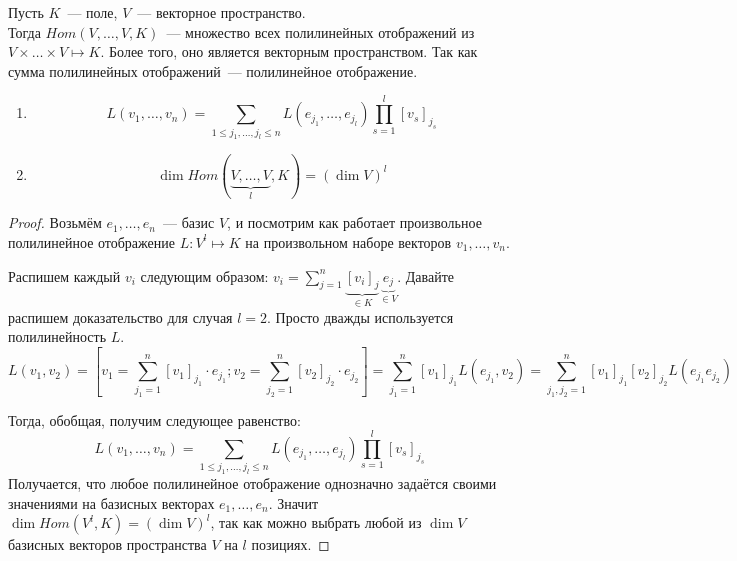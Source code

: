 \begin{definition}
    Пусть $K$~--- поле, $V$~--- векторное пространство.\\ 
    Тогда $Hom(V,\dots, V,K)$~--- множество всех полилинейных отображений
    из $V\times\dots\times V\mapsto K$.
    Более того, оно является векторным пространством. Так как сумма полилинейных
    отображений~--- полилинейное отображение.
\end{definition}
\begin{statement}\leavevmode
    \begin{enumerate}
        \item \[
                L(v_1,\dots, v_n) = \sum\limits_{1\le j_1, \dots, j_l \le n}^{}{L(e_{j_1}, \dots, e_{j_l})\prod\limits_{s=1}^{l}{[v_s]_{j_s}}}
            \]
        \item \[
                \dim Hom(\underbrace{V,\dots, V}_{l}, K) = (\dim V)^l
            \]
    \end{enumerate}
\end{statement}
\begin{proof}
    Возьмём $e_1,\dots, e_n$~--- базис $V$, и посмотрим как работает произвольное
    полилинейное отображение $L: V^{l} \mapsto K$ на произвольном наборе векторов $v_1,\dots, v_n$.

    Распишем каждый $v_i$ следующим образом: $v_i = \sum\limits_{j=1}^{n}{\underbrace{[v_i]_j}_{\in K}\underbrace{e_j}_{\in V}}$.
    Давайте распишем доказательство для случая $l=2$. Просто дважды используется полилинейность $L$.
    \[
        L(v_1, v_2) = \left[v_1 = \sum\limits_{j_1=1}^{n}{[v_1]_{j_1}\cdot e_{j_1}};
        v_2 = \sum\limits_{j_2=1}^{n}{[v_2]_{j_2}\cdot e_{j_2}}\right]=
        \sum\limits_{j_1=1}^{n}{[v_1]_{j_1}L(e_{j_1}, v_2)} =
        \sum\limits_{j_1,j_2=1}^{n}{[v_1]_{j_1}[v_2]_{j_2}L(e_{j_1}e_{j_2})}
    \]

    Тогда, обобщая, получим следующее равенство:
    \begin{equation}
        L(v_1,\dots, v_n) = \sum\limits_{1\le j_1, \dots, j_l \le n}^{}{L(e_{j_1}, \dots, e_{j_l})\prod\limits_{s=1}^{l}{[v_s]_{j_s}}} \label{eq:7:1}
    \end{equation} 
    Получается, что любое полилинейное отображение однозначно задаётся своими значениями на базисных векторах $e_1,\dots, e_n$.
    Значит $\dim Hom(V^l, K) = (\dim V)^l$, так как можно выбрать любой из $\dim V$ базисных векторов пространства $V$ на
    $l$ позициях.
\end{proof}

